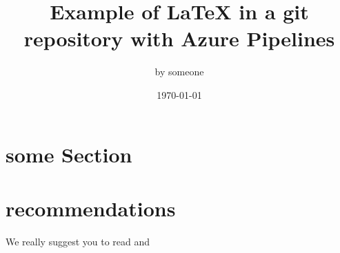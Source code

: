 \documentclass[a4paper]{article}
\title{Example of \LaTeX{} in a git repository with Azure Pipelines}
\author{by someone}
\affil{some institute}
\date{\today}
\begin{document}
\maketitle
\vspace{3em}
\tableofcontents
\pagebreak

\section{some Section}

\lipsum[1-3]

\section{recommendations}

We really suggest you to read \cite{Any00} and \cite{NoO15}

\printbibliography
\end{document}
